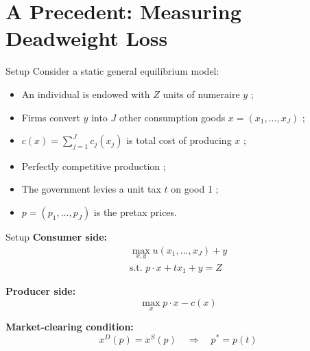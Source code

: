 \documentclass{beamer}
\begin{document}
\section{A Precedent: Measuring Deadweight Loss}
\begin{frame}[shrink]
	\transfade %
	\tableofcontents[sectionstyle=show/shaded,subsectionstyle=show/shaded/hide]
	\addtocounter{framenumber}{-1}
\end{frame}
\begin{frame}{Setup}
	Consider a static general equilibrium model:
	\begin{itemize}
		\item An individual is endowed with $Z$ units of numeraire $y$ ;
		\item Firms convert $y$ into $J$ other consumption goods $x=(x_1,...,x_J)$ ;
		\item $c(x)=\sum_{j=1}^Jc_j(x_j)$ is total cost of producing $x$ ;
		\item Perfectly competitive production ;
		\item The government levies a unit tax $t$ on good 1 ;
		\item $p=(p_1,...,p_J)$ is the pretax prices.
	\end{itemize}
\end{frame}
\begin{frame}{Setup}
	\textbf{Consumer side:}
	\begin{equation}
		\begin{aligned}
			\max_{x,y} u(x_1,...,x_J)+y \\
			\mbox{s.t. } p\cdot x + tx_1 + y = Z
		\end{aligned}
	\end{equation}

	\textbf{Producer side:}
	\begin{equation}
		\max_x p\cdot x - c(x)
	\end{equation}

	\textbf{Market-clearing condition:}
	\begin{equation}
		x^D(p) = x^S(p)\quad \Rightarrow \quad p^* = p(t)
	\end{equation}
\end{frame}
\end{document}
